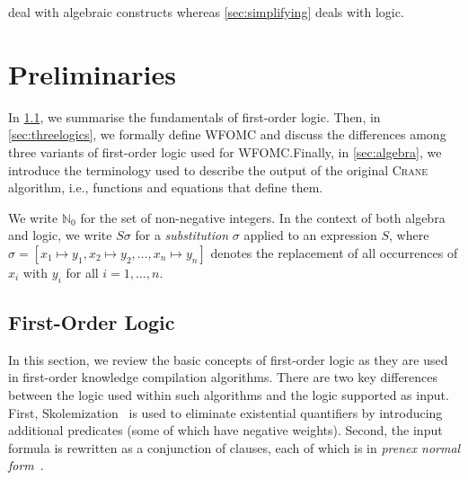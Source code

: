 \documentclass{article}
\theoremstyle{definition}
\theoremstyle{remark}
\begin{document}
 deal with algebraic constructs whereas
\cref{sec:simplifying} deals with logic.

\section{Preliminaries}

In \cref{sec:logic}, we summarise the fundamentals of first-order logic. Then,
in \cref{sec:threelogics}, we formally define WFOMC and discuss the differences
among three variants of first-order logic used for WFOMC.\@ Finally, in
\cref{sec:algebra}, we introduce the terminology used to describe the output of
the original \textsc{Crane} algorithm, i.e., functions and equations that define
them.

We write $\mathbb{N}_{0}$ for the set of non-negative integers. In the context
of both algebra and logic, we write $S\sigma$ for a \emph{substitution} $\sigma$
applied to an expression $S$, where
$\sigma = [x_{1} \mapsto y_{1}, x_{2} \mapsto y_{2}, \dots, x_{n} \mapsto y_{n}]$
denotes the replacement of all occurrences of $x_{i}$ with $y_{i}$ for all
$i = 1, \dots, n$.

\subsection{First-Order Logic}\label{sec:logic}

In this section, we review the basic concepts of first-order logic as they are
used in first-order knowledge compilation algorithms. There are two key
differences between the logic used within such algorithms and the logic
supported as input. First, Skolemization~\cite{DBLP:conf/kr/BroeckMD14} is used
to eliminate existential quantifiers by introducing additional predicates (some
of which have negative weights). Second, the input formula is rewritten as a
conjunction of clauses, each of which is in \emph{prenex normal
  form}~\cite{hinman2018fundamentals}.
\end{document}
